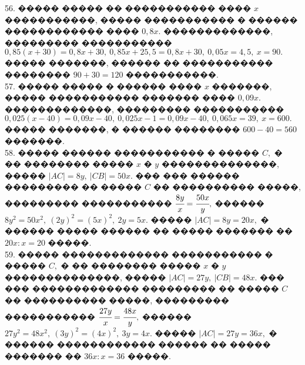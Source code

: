 \documentclass[12pt]{article}
\begin{document}
56. ����� ����� �� ����������� ���� $x$ �����������, ����� ����������� � ������ ������������ ���� $0,8x.$ �������������, ��������� ����������� $0,85(x+30)=0,8x+30,\ 0,85x+25,5=0,8x+30,\ 0,05x=4,5,\ x=90.$ ����� �������, ������ �� ����������� �������� $90+30=120$ �����������.\\
57. ����� ����� � ������ ���� $x$ �������, ����� ����������� ������� ���� $0,09x.$ �������������, ��������� ����������� $0,025(x-40)=0,09x-40,\ 0,025x-1=0,09x-40,\ 0,065x=39,\ x=600.$ ����� �������, � ������ �������� $600-40=560$ �������.\\
58. ����� ������ ����������� � ����� $C,$ � �� �������� ����� $x$ � $y$ ��������������, ����� $|AC|=8y,\ |CB|=50x.$ ��� ��� ������ ��������� �� ����� $C$ �� ���������� �����, ��������� ����������� $\cfrac{8y}{x}=\cfrac{50x}{y},$ ������ $8y^2=50x^2,\ (2y)^2=(5x)^2,\ 2y=5x.$ ����� $|AC|=8y=20x,$ � ������ ����� ������ �� ����� ������� �� $20x:x=20$ �����.\\
59. ����� ������������� ����������� � ����� $C,$ � �� �������� ����� $x$ � $y$ ��������������, ����� $|AC|=27y,\ |CB|=48x.$ ��� ��� ������������� ��������� �� ����� $C$ �� ���������� �����, ��������� ����������� $\cfrac{27y}{x}=\cfrac{48x}{y},$ ������ $27y^2=48x^2,\ (3y)^2=(4x)^2,\ 3y=4x.$ ����� $|AC|=27y=36x,$ � ������ ������������ ������ �� ����� ������� �� $36x:x=36$ �����.
\newpage
\end{document}

